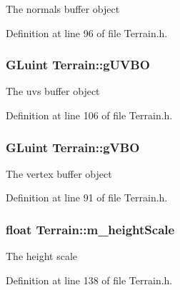 The normals buffer object 



Definition at line 96 of file Terrain.\+h.

\subsubsection[{\texorpdfstring{g\+U\+V\+BO}{gUVBO}}]{\setlength{\rightskip}{0pt plus 5cm}G\+Luint Terrain\+::g\+U\+V\+BO\hspace{0.3cm}{\ttfamily [private]}}\hypertarget{class_terrain_aae611c939b8e3aad331745c9fb979dab}{}\label{class_terrain_aae611c939b8e3aad331745c9fb979dab}


The uvs buffer object 



Definition at line 106 of file Terrain.\+h.

\subsubsection[{\texorpdfstring{g\+V\+BO}{gVBO}}]{\setlength{\rightskip}{0pt plus 5cm}G\+Luint Terrain\+::g\+V\+BO\hspace{0.3cm}{\ttfamily [private]}}\hypertarget{class_terrain_a3eeadcd1e1679c7e7b9abeb0246f186a}{}\label{class_terrain_a3eeadcd1e1679c7e7b9abeb0246f186a}


The vertex buffer object 



Definition at line 91 of file Terrain.\+h.

\subsubsection[{\texorpdfstring{m\+\_\+height\+Scale}{m_heightScale}}]{\setlength{\rightskip}{0pt plus 5cm}float Terrain\+::m\+\_\+height\+Scale\hspace{0.3cm}{\ttfamily [private]}}\hypertarget{class_terrain_a63a6588e95aa892d8cd1d7236a7a3870}{}\label{class_terrain_a63a6588e95aa892d8cd1d7236a7a3870}


The height scale 



Definition at line 138 of file Terrain.\+h.




